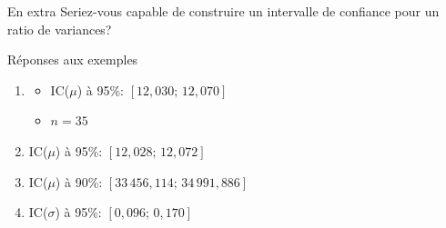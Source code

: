 \documentclass{BeamerTemplate}
\begin{document}
\begin{frame}[t]{En extra}
    Seriez-vous capable de construire un intervalle de confiance pour un ratio de variances?
\end{frame}
\begin{frame}[t]{Réponses aux exemples}

{\scriptsize

\begin{enumerate}
  \item
      \begin{itemize}
      \item[b)] {\scriptsize IC($\mu$) à 95\%: $[12,030;\,12,070]$}
      \item[c)] {\scriptsize $n=35$}
     \end{itemize}
 \item IC($\mu$) à 95\%: $[12,028;\,12,072]$
 \item IC($\mu$) à 90\%: $[33\, 456,114 ; \, 34\, 991,886 ]$
 \item IC($\sigma$) à 95\%: $[0,096; \, 0,170]$
 \end{enumerate}
 }
\end{frame}
\end{document}

